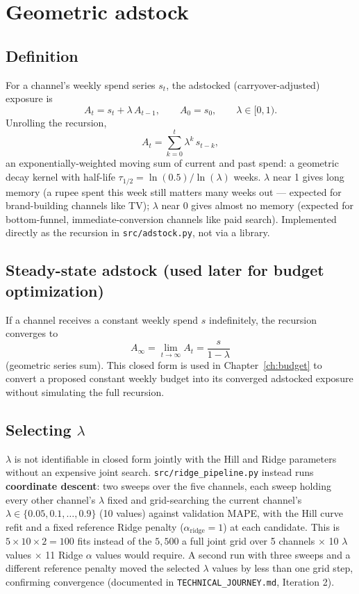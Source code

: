\documentclass[11pt]{report}
\begin{document}
\chapter{Geometric adstock}
\label{ch:adstock}

\section{Definition}
For a channel's weekly spend series $s_t$, the adstocked (carryover-adjusted) exposure is
\[
  A_t = s_t + \lambda \, A_{t-1}, \qquad A_0 = s_0, \qquad \lambda \in [0, 1).
\]
Unrolling the recursion,
\[
  A_t = \sum_{k=0}^{t} \lambda^k \, s_{t-k},
\]
an exponentially-weighted moving sum of current and past spend: a geometric decay kernel
with half-life $\tau_{1/2} = \ln(0.5)/\ln(\lambda)$ weeks. $\lambda$ near 1 gives long
memory (a rupee spent this week still matters many weeks out --- expected for
brand-building channels like TV); $\lambda$ near 0 gives almost no memory (expected for
bottom-funnel, immediate-conversion channels like paid search). Implemented directly as
the recursion in \texttt{src/adstock.py}, not via a library.

\section{Steady-state adstock (used later for budget optimization)}
If a channel receives a constant weekly spend $s$ indefinitely, the recursion converges to
\[
  A_\infty = \lim_{t\to\infty} A_t = \frac{s}{1-\lambda}
\]
(geometric series sum). This closed form is used in Chapter~\ref{ch:budget} to convert a
proposed constant weekly budget into its converged adstocked exposure without simulating
the full recursion.

\section{Selecting $\lambda$}
$\lambda$ is not identifiable in closed form jointly with the Hill and Ridge parameters
without an expensive joint search. \texttt{src/ridge\_pipeline.py} instead runs
\textbf{coordinate descent}: two sweeps over the five channels, each sweep holding every
other channel's $\lambda$ fixed and grid-searching the current channel's $\lambda \in
\{0.05, 0.1, \dots, 0.9\}$ (10 values) against validation MAPE, with the Hill curve
refit and a fixed reference Ridge penalty ($\alpha_{\text{ridge}}=1$) at each candidate.
This is $5 \times 10 \times 2 = 100$ fits instead of the $5{,}500$ a full joint grid over
5 channels $\times$ 10 $\lambda$ values $\times$ 11 Ridge $\alpha$ values would require.
A second run with three sweeps and a different reference penalty moved the selected
$\lambda$ values by less than one grid step, confirming convergence (documented in
\texttt{TECHNICAL\_JOURNEY.md}, Iteration 2).
\end{document}
